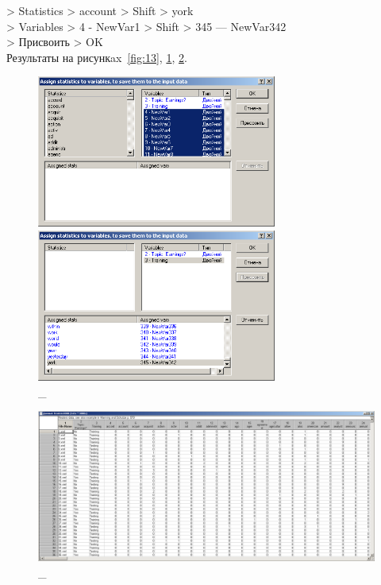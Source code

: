 > Statistics > account > Shift > york \\
> Variables > 4 - NewVar1 > Shift > 345 — NewVar342 \\
> Присвоить > OK \\

Результаты на рисункax~\ref{fig:13}, \ref{fig:14}, \ref{fig:15}.

\begin{figure}[p!h]
  \centering

  \begin{minipage}{0.49\textwidth}
    \centering

    \includegraphics[height=5cm]
    {inc/13.PNG}

    \caption{\_}

    \label{fig:13}
  \end{minipage}
  \begin{minipage}{0.49\textwidth}
    \centering

    \includegraphics[height=5cm]
    {inc/14.PNG}

    \caption{\_}

    \label{fig:14}
  \end{minipage}
\end{figure}

\begin{figure}[p!h]
  \centering

  \includegraphics[width=17cm]
  {inc/15.PNG}

  \caption{\_}

  \label{fig:15}
\end{figure}

